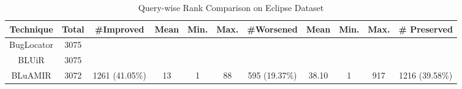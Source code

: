 \documentclass[conference]{IEEEtran}
\begin{document}
\begin{table}[htbp]
	\centering
	\caption{Query-wise Rank Comparison on Eclipse Dataset}
	\label{tab:Query-Rank}
	\begin{tabular}{c|c||c|c|c||c|c|c|c|c|c}
		\hline
		
		\textbf{Technique}
		& \textbf{Total}
		& \textbf{\#Improved}
		& \textbf{Mean}
		& \textbf{Min.} 
		& \textbf{Max.} & 
		\textbf{\#Worsened} &
		\textbf{Mean}  & 
		\textbf{Min.} &
		\textbf{Max.} &
		\textbf{\# Preserved}  \\
		\hline \hline
		BugLocator & 
		3075 &
	 &
	 &
	 &
		 &
	 &
	 &
	 &
		 &
		\\ \hline
		BLUiR & 
		3075 &
		&
		&
		&
		&
		&
		&
		&
		&
		\\ \hline
		BLuAMIR & 
		3072 &
		1261 (41.05\%) &
		13 &
		1 &
		88 &
		595 (19.37\%) &
		38.10 &
		1 &
		917 &
		1216 (39.58\%)\\
		\hline
	\end{tabular}
	\centering
\end{table}
\end{document}
